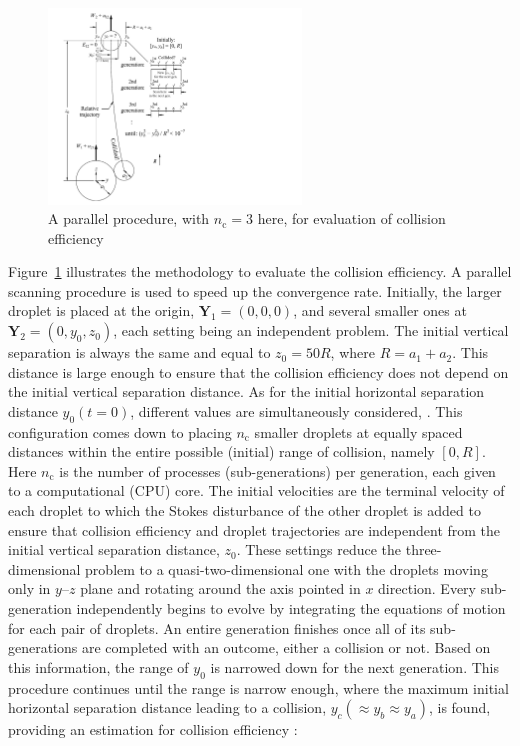 \documentclass[../thesis.tex]{subfiles}
\begin{document}

\begin{figure}%
\center
\includegraphics[trim=15mm 05mm 125mm 05mm, clip, width=0.6\textwidth]{../figs/PRF/fig1.pdf}
\caption{A parallel procedure, with $n_\text{c}=3$ here, for evaluation of collision efficiency}
\label{fig:colleff}
\end{figure}

Figure~\ref{fig:colleff} illustrates the methodology to evaluate the collision efficiency. A parallel scanning procedure is used to speed up the convergence rate. Initially, the larger droplet is placed at the origin, \mbox{$\boldsymbol{Y}_1=(0,0,0)$}, and several smaller ones at \mbox{$\boldsymbol{Y}_2=(0,y_0,z_0)$}, each setting being an independent problem. The initial vertical separation is always the same and equal to $z_0 = 50R$, where $R=a_1+a_2$. This distance is large enough to ensure that the collision efficiency does not depend on the initial vertical separation distance. As for the initial horizontal separation distance $y_0(t=0)$, different values are simultaneously considered, . This configuration comes down to placing $n_\text{c}$ smaller droplets at equally spaced distances within the entire possible (initial) range of collision, namely $[0,R]$. Here $n_\text{c}$ is the number of processes (sub-generations) per generation, each given to a computational (CPU) core. The initial velocities are the terminal velocity of each droplet to which the Stokes disturbance of the other droplet is added to ensure that collision efficiency and droplet trajectories are independent from the initial vertical separation distance, $z_0$. These settings reduce the three-dimensional problem to a quasi-two-dimensional one with the droplets moving only in $y$--$z$ plane and rotating around the axis pointed in $x$ direction. Every sub-generation independently begins to evolve by integrating the equations of motion for each pair of droplets. An entire generation finishes once all of its sub-generations are completed with an outcome, either a collision or not. Based on this information, the range of $y_0$ is narrowed down for the next generation. This procedure continues until the range is narrow enough, where the maximum initial horizontal separation distance leading to a collision, $y_c (\approx y_b \approx y_a)$, is found, providing an estimation for collision efficiency \citep{PK97}:
\end{document}
